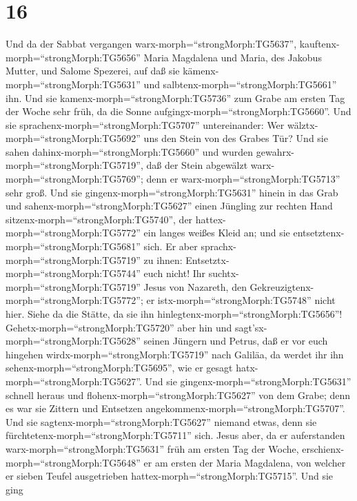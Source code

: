 \hypertarget{section-15}{%
\section{16}\label{section-15}}

 Und da der Sabbat vergangen
warx-morph=``strongMorph:TG5637'', kauftenx-morph=``strongMorph:TG5656''
Maria Magdalena und Maria, des Jakobus Mutter, und Salome Spezerei, auf
daß sie kämenx-morph=``strongMorph:TG5631'' und
salbtenx-morph=``strongMorph:TG5661'' ihn.  Und sie
kamenx-morph=``strongMorph:TG5736'' zum Grabe am ersten Tag der Woche
sehr früh, da die Sonne aufgingx-morph=``strongMorph:TG5660''.
 Und sie sprachenx-morph=``strongMorph:TG5707''
untereinander: Wer wälztx-morph=``strongMorph:TG5692'' uns den Stein von
des Grabes Tür?  Und sie sahen
dahinx-morph=``strongMorph:TG5660'' und wurden
gewahrx-morph=``strongMorph:TG5719'', daß der Stein abgewälzt
warx-morph=``strongMorph:TG5769''; denn er
warx-morph=``strongMorph:TG5713'' sehr groß.  Und sie
gingenx-morph=``strongMorph:TG5631'' hinein in das Grab und
sahenx-morph=``strongMorph:TG5627'' einen Jüngling zur rechten Hand
sitzenx-morph=``strongMorph:TG5740'', der
hattex-morph=``strongMorph:TG5772'' ein langes weißes Kleid an; und sie
entsetztenx-morph=``strongMorph:TG5681'' sich.  Er aber
sprachx-morph=``strongMorph:TG5719'' zu ihnen:
Entsetztx-morph=``strongMorph:TG5744'' euch nicht! Ihr
suchtx-morph=``strongMorph:TG5719'' Jesus von Nazareth, den
Gekreuzigtenx-morph=``strongMorph:TG5772''; er
istx-morph=``strongMorph:TG5748'' nicht hier. Siehe da die Stätte, da
sie ihn hinlegtenx-morph=``strongMorph:TG5656''! 
Gehetx-morph=``strongMorph:TG5720'' aber hin und
sagt'sx-morph=``strongMorph:TG5628'' seinen Jüngern und Petrus, daß er
vor euch hingehen wirdx-morph=``strongMorph:TG5719'' nach Galiläa, da
werdet ihr ihn sehenx-morph=``strongMorph:TG5695'', wie er gesagt
hatx-morph=``strongMorph:TG5627''.  Und sie
gingenx-morph=``strongMorph:TG5631'' schnell heraus und
flohenx-morph=``strongMorph:TG5627'' von dem Grabe; denn es war sie
Zittern und Entsetzen angekommenx-morph=``strongMorph:TG5707''. Und sie
sagtenx-morph=``strongMorph:TG5627'' niemand etwas, denn sie
fürchtetenx-morph=``strongMorph:TG5711'' sich.  Jesus aber,
da er auferstanden warx-morph=``strongMorph:TG5631'' früh am ersten Tag
der Woche, erschienx-morph=``strongMorph:TG5648'' er am ersten der Maria
Magdalena, von welcher er sieben Teufel ausgetrieben
hattex-morph=``strongMorph:TG5715''.  Und sie ging
